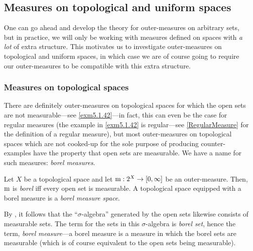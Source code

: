 \subsection{Measures on topological and uniform spaces}

One can go ahead and develop the theory for outer-measures on arbitrary sets, but in practice, we will only be working with measures defined on spaces with \emph{a lot} of extra structure.  This motivates us to investigate outer-measures on topological and uniform spaces, in which case we are of course going to require our outer-measures to be compatible with this extra structure.

\subsubsection{Measures on topological spaces}

There are definitely outer-measures on topological spaces for which the open sets are not measurable---see \cref{exm5.1.42}---in fact, this can even be the case for regular measures (the example in \cref{exm5.1.42} is regular---see \cref{RegularMeasure} for the definition of a regular measure), but most outer-measures on topological spaces which are not cooked-up for the sole purpose of producing counter-examples have the property that open sets are measurable.  We have a name for such measures:  \emph{borel measures}.
\begin{dfn}\label{BorelMeasure}
Let $X$ be a topological space and let $\mathrm{m} :2^X\rightarrow [0,\infty ]$ be an outer-measure.  Then, $\mathrm{m}$ is \emph{borel} iff every open set is measurable.  A topological space equipped with a borel measure is a \emph{borel measure space}.
\begin{rmk}
By , it follows that the ``$\sigma$-algebra'' generated by the open sets likewise consists of measurable sets.  The term for the sets in this $\sigma$-algebra is \emph{borel set}, hence the term, \emph{borel measure}---a borel measure is a measure in which the borel sets are measurable (which is of course equivalent to the open sets being measurable).
\end{rmk}
\end{dfn}


